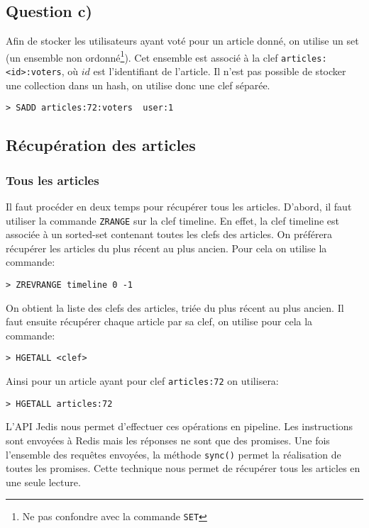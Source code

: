 \documentclass[article,a4paper,12pt]{article}
\begin{document}
\subsection{Question c)}
\label{sec:orgheadline5}

Afin de stocker les utilisateurs ayant voté pour un article donné, on utilise
un set (un ensemble non ordonné\footnote{Ne pas confondre avec la commande
\texttt{SET}}). Cet ensemble est associé à la clef \texttt{articles:<id>:voters}, où \(id\)
est l'identifiant de l'article. Il n'est pas possible de stocker une
collection dans un hash, on utilise donc une clef séparée.

\begin{verbatim}
> SADD articles:72:voters  user:1
\end{verbatim}


\subsection{Récupération des articles}
\label{sec:orgheadline8}
\subsubsection{Tous les articles}
\label{sec:orgheadline6}

Il faut procéder en deux temps pour récupérer tous les articles. D'abord, il
faut utiliser la commande \texttt{ZRANGE} sur la clef timeline. En effet, la clef
timeline est associée à un sorted-set contenant toutes les clefs des articles.
On préférera récupérer les articles du plus récent au plus ancien. Pour cela on
utilise la commande:
\begin{verbatim}
> ZREVRANGE timeline 0 -1
\end{verbatim}

On obtient la liste des clefs des articles, triée du plus récent au plus
ancien. Il faut ensuite récupérer chaque article par sa clef, on utilise pour
cela la commande:
\begin{verbatim}
> HGETALL <clef>
\end{verbatim}
Ainsi pour un article ayant pour clef \texttt{articles:72} on utilisera:
\begin{verbatim}
> HGETALL articles:72
\end{verbatim}

L'API Jedis nous permet d'effectuer ces opérations en pipeline. Les
instructions sont envoyées à Redis mais les réponses ne sont que des promises.
Une fois l'ensemble des requêtes envoyées, la méthode \texttt{sync()} permet la
réalisation de toutes les promises. Cette technique nous permet de récupérer
tous les articles en une seule lecture.
\end{document}
